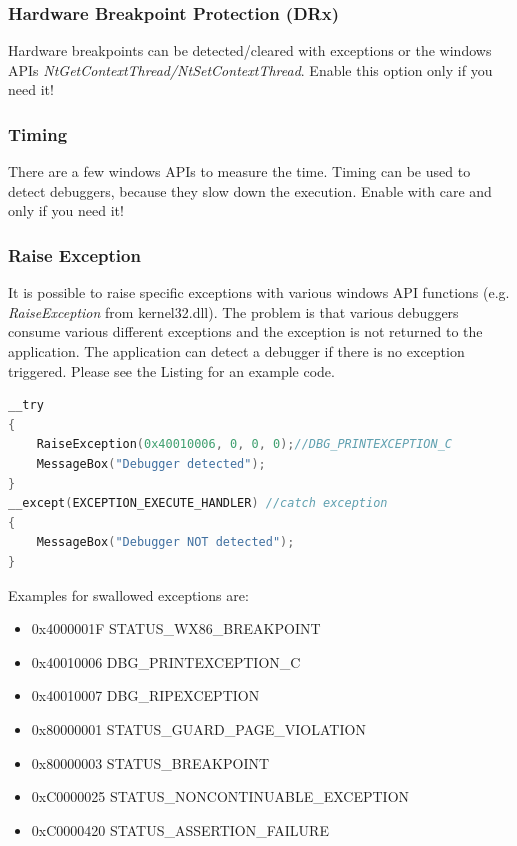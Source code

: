 \documentclass[10pt,a4paper]{article}
\begin{document}
\subsubsection{Hardware Breakpoint Protection (DRx)}
Hardware breakpoints can be detected/cleared with exceptions or the windows APIs \textit{NtGetContextThread/NtSetContextThread}. Enable this option only if you need it!

\subsubsection{Timing}
There are a few windows APIs to measure the time. Timing can be used to detect debuggers, because they slow down the execution. Enable with care and only if you need it!

\subsubsection{Raise Exception}
\label{sec:RaiseException_section}
It is possible to raise specific exceptions with various windows API functions (e.g. \textit{RaiseException} from kernel32.dll). The problem is that various debuggers consume various different exceptions and the exception is not returned to the application. The application can detect a debugger if there is no exception triggered. Please see the Listing for an example code.

\begin{lstlisting}[language=C, caption=Raise Exception Example]
__try
{
    RaiseException(0x40010006, 0, 0, 0);//DBG_PRINTEXCEPTION_C
    MessageBox("Debugger detected");
}
__except(EXCEPTION_EXECUTE_HANDLER) //catch exception
{
    MessageBox("Debugger NOT detected");
}
\end{lstlisting}

Examples for swallowed exceptions are:

\begin{itemize}
\item 0x4000001F STATUS\_WX86\_BREAKPOINT
\item 0x40010006 DBG\_PRINTEXCEPTION\_C
\item 0x40010007 DBG\_RIPEXCEPTION
\item 0x80000001 STATUS\_GUARD\_PAGE\_VIOLATION
\item 0x80000003 STATUS\_BREAKPOINT
\item 0xC0000025 STATUS\_NONCONTINUABLE\_EXCEPTION
\item 0xC0000420 STATUS\_ASSERTION\_FAILURE
\end{itemize}
\end{document}
